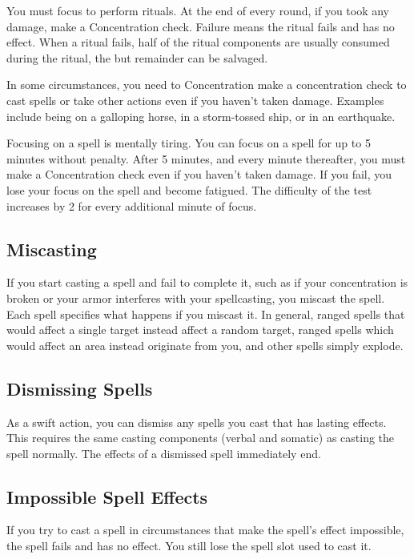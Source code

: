  You must focus to perform rituals. At the end of every round, if you took any damage, make a Concentration check. Failure means the ritual fails and has no effect. When a ritual fails, half of the ritual components are usually consumed during the ritual, the but remainder can be salvaged.

 In some circumstances, you need to Concentration make a concentration check to cast spells or take other actions even if you haven't taken damage. Examples include being on a galloping horse, in a storm-tossed ship, or in an earthquake.

 Focusing on a spell is mentally tiring. You can focus on a spell for up to 5 minutes without penalty. After 5 minutes, and every minute thereafter, you must make a Concentration check even if you haven't taken damage. If you fail, you lose your focus on the spell and become fatigued. The difficulty of the test increases by 2 for every additional minute of focus.

\subsection{Miscasting}\label{Miscasting}

If you start casting a spell and fail to complete it, such as if your concentration is broken or your armor interferes with your spellcasting, you miscast the spell. Each spell specifies what happens if you miscast it. In general, ranged spells that would affect a single target instead affect a random target, ranged spells which would affect an area instead originate from you, and other spells simply explode.

\subsection{Dismissing Spells}

As a swift action, you can dismiss any spells you cast that has lasting effects. This requires the same casting components (verbal and somatic) as casting the spell normally. The effects of a dismissed spell immediately end.

\subsection{Impossible Spell Effects}
If you try to cast a spell in circumstances that make the spell's effect impossible, the spell fails and has no effect. You still lose the spell slot used to cast it.

